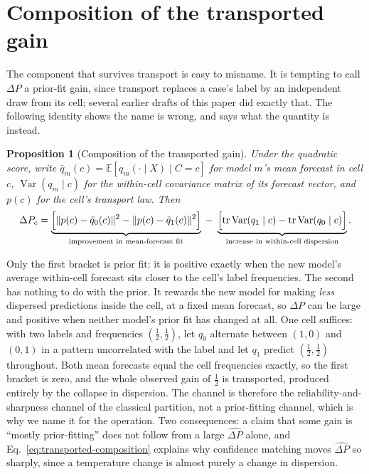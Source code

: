 \documentclass[preprint,times,10pt,a4paper]{elsarticle}
\theoremstyle{plain}
\newtheorem{proposition}{Proposition}
\theoremstyle{definition}
\begin{document}
\section{Composition of the transported gain}\label{app:transported}

The component that survives transport is easy to misname. It is tempting to call
$\Delta P$ a prior-fit gain, since transport replaces a case's label by an independent
draw from its cell; several earlier drafts of this paper did exactly that. The following
identity shows the name is wrong, and says what the quantity is instead.

\begin{proposition}[Composition of the transported gain]\label{prop:transported}
Under the quadratic score, write $\bar q_m(c)=\mathbb E[q_m(\cdot\mid X)\mid C=c]$ for
model $m$'s mean forecast in cell $c$, $\operatorname{Var}(q_m\mid c)$ for the
within-cell covariance matrix of its forecast vector, and $p(c)$ for the cell's transport
law. Then
\begin{equation}
\Delta P_c=
\underbrace{\Bigl[\lVert p(c)-\bar q_0(c)\rVert^2-\lVert p(c)-\bar q_1(c)\rVert^2\Bigr]}
_{\text{improvement in mean-forecast fit}}
\;-\;
\underbrace{\Bigl[\operatorname{tr}\operatorname{Var}(q_1\mid c)-
\operatorname{tr}\operatorname{Var}(q_0\mid c)\Bigr]}_{\text{increase in within-cell dispersion}} .
\label{eq:transported-composition}
\end{equation}
\end{proposition}

Only the first bracket is prior fit: it is positive exactly when the new model's average
within-cell forecast sits closer to the cell's label frequencies. The second has nothing to
do with the prior. It rewards the new model for making \emph{less} dispersed predictions
inside the cell, at a fixed mean forecast, so $\Delta P$ can be large and positive when
neither model's prior fit has changed at all. One cell suffices: with two labels and
frequencies $(\tfrac12,\tfrac12)$, let $q_0$ alternate between $(1,0)$ and $(0,1)$ in a
pattern uncorrelated with the label and let $q_1$ predict $(\tfrac12,\tfrac12)$ throughout.
Both mean forecasts equal the cell frequencies exactly, so the first bracket is zero, and the
whole observed gain of $\tfrac12$ is transported, produced entirely by the collapse in
dispersion. The channel is therefore the reliability-and-sharpness channel of the classical
partition, not a prior-fitting channel, which is why we name it for the operation. Two
consequences: a claim that some gain is ``mostly prior-fitting'' does not follow from a large
$\widehat{\Delta P}$ alone, and Eq.~\eqref{eq:transported-composition} explains why
confidence matching moves $\widehat{\Delta P}$ so sharply, since a temperature change is
almost purely a change in dispersion.
\end{document}
